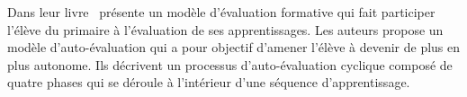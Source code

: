 Dans leur livre~\cite{doyon_faire_1991} présente un modèle d'évaluation formative qui fait participer l'élève du primaire à l'évaluation de ses apprentissages. 
Les auteurs propose un modèle d'auto-évaluation qui a pour objectif d'amener l'élève à devenir de plus en plus autonome.
Ils décrivent un processus d'auto-évaluation cyclique composé de quatre phases qui se déroule à l'intérieur d'une séquence d'apprentissage.

